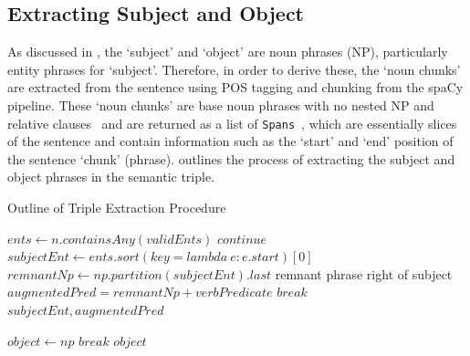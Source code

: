 \subsection{Extracting Subject and Object}
As discussed in , the `subject' and `object' are noun phrases (NP), particularly entity phrases for `subject'. Therefore, in order to derive these, the `noun chunks' are extracted from the sentence using POS tagging and chunking from the spaCy pipeline. These `noun chunks' are base noun phrases with no nested NP and relative clauses~\cite{spacy} and are returned as a list of \texttt{Spans}~\cite{spacy}, which are essentially slices of the sentence and contain information such as the `start' and `end' position of the sentence `chunk' (phrase).  outlines the process of extracting the subject and object phrases in the semantic triple.

\begin{algorithm}[H]
  \caption{Outline of Triple Extraction Procedure}
  \label{alg:subject_relation}
  \begin{algorithmic}   
    
      \State $ents \gets n.containsAny(validEnts)$ 
        \State $continue$
        \EndIf
      \State $subjectEnt \gets ents.sort(key = lambda \ e: e.start)[0]$
      \State $remnantNp \gets np.partition(subjectEnt).last$ 
      \Comment remnant phrase right of subject
      \State $augmentedPred = remnantNp + verbPredicate $
      \State $break$
      \EndIf
    \EndFor
    \State \Return $subjectEnt, augmentedPred$
  \EndFunction

      \State $object \gets np$ 
      \State $break$
      \EndIf
    \EndFor
    \State \Return $object$
  \EndFunction
\end{algorithmic}
\end{algorithm}

\vspace{-3ex}
